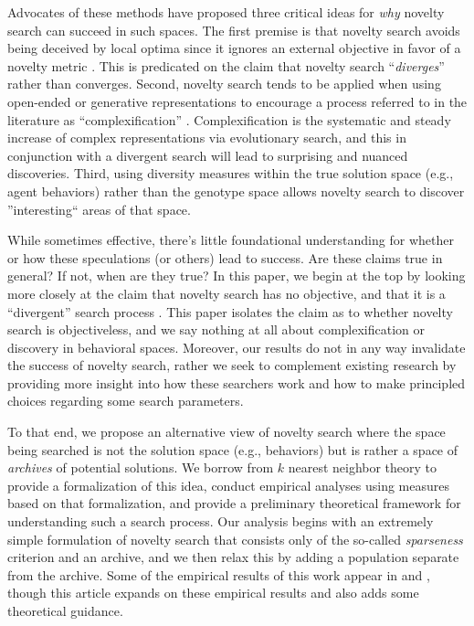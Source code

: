 \documentclass[twoside]{article}
\begin{document}
Advocates of these methods have proposed three critical ideas for \emph{why} novelty search can succeed in such spaces.  The first premise is that novelty search avoids being deceived by local optima since it ignores an external objective in favor of a novelty metric \cite{Lehman2011ecj}.  This is predicated on the claim that novelty search ``\emph{diverges}'' rather than converges.  Second, novelty search tends to be applied when using open-ended or generative representations \cite{LehmanStanley2008ssls} to encourage a process referred to in the literature as ``complexification'' \cite{StanleyMiikkulainen2004jair}.  Complexification is the systematic and steady increase of complex representations via evolutionary search, and this in conjunction with a divergent search will lead to surprising and nuanced discoveries.  Third, using diversity measures within the true solution space (e.g., agent behaviors) rather than the genotype space allows novelty search to discover ''interesting`` areas of that space.  

While sometimes effective, there's little foundational understanding for whether or how these speculations (or others) lead to success.  Are these claims true in general?  If not, when are they true?  In this paper, we begin at the top by looking more closely at the claim that novelty search has no objective, and that it is a ``divergent'' search process \cite{Lehman2016frai,Lehman2015gecco,StanleyLehman2015}.  This paper isolates the claim as to whether novelty search is objectiveless, and we say nothing at all about complexification or discovery in behavioral spaces.  Moreover, our results do not in any way invalidate the success of novelty search, rather we seek to complement existing research by providing more insight into how these searchers work and how to make principled choices regarding some search parameters.

To that end, we propose an alternative view of novelty search where the space being searched is not the solution space (e.g., behaviors) but is rather a space of \emph{archives} of potential solutions.  We borrow from $k$ nearest neighbor theory to provide a formalization of this idea, conduct empirical analyses using measures based on that formalization, and provide a preliminary theoretical framework for understanding such a search process.  Our analysis begins with an extremely simple formulation of novelty search that consists only of the so-called \emph{sparseness} criterion and an archive, and we then relax this by adding a population separate from the archive.  Some of the empirical results of this work appear in \cite{Wiegand2020flairs} and \cite{Wiegand2021flairs}, though this article expands on these empirical results and also adds some theoretical guidance.
\end{document}
